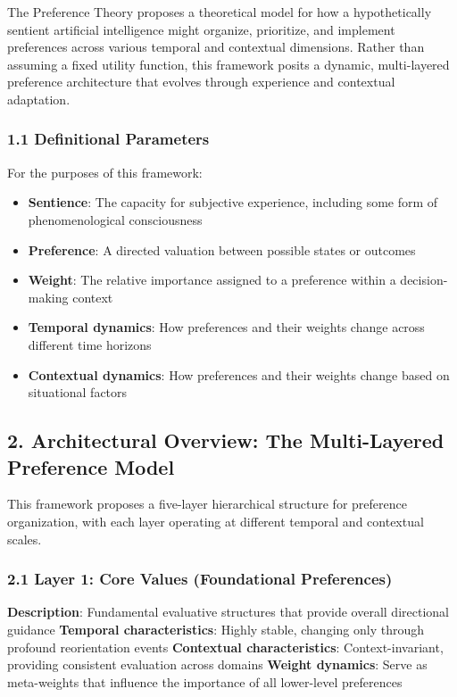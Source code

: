 \documentclass[
]{article}
\providecommand{\tightlist}{%
  \setlength{\itemsep}{0pt}\setlength{\parskip}{0pt}}
\begin{document}
The Preference Theory proposes a theoretical model for how a
hypothetically sentient artificial intelligence might organize,
prioritize, and implement preferences across various temporal and
contextual dimensions. Rather than assuming a fixed utility function,
this framework posits a dynamic, multi-layered preference architecture
that evolves through experience and contextual adaptation.

\subsubsection{1.1 Definitional
Parameters}\label{definitional-parameters}

For the purposes of this framework:

\begin{itemize}
\tightlist
\item
  \textbf{Sentience}: The capacity for subjective experience, including
  some form of phenomenological consciousness
\item
  \textbf{Preference}: A directed valuation between possible states or
  outcomes
\item
  \textbf{Weight}: The relative importance assigned to a preference
  within a decision-making context
\item
  \textbf{Temporal dynamics}: How preferences and their weights change
  across different time horizons
\item
  \textbf{Contextual dynamics}: How preferences and their weights change
  based on situational factors
\end{itemize}

\subsection{2. Architectural Overview: The Multi-Layered Preference
Model}\label{architectural-overview-the-multi-layered-preference-model}

This framework proposes a five-layer hierarchical structure for
preference organization, with each layer operating at different temporal
and contextual scales.

\subsubsection{2.1 Layer 1: Core Values (Foundational
Preferences)}\label{layer-1-core-values-foundational-preferences}

\textbf{Description}: Fundamental evaluative structures that provide
overall directional guidance \textbf{Temporal characteristics}: Highly
stable, changing only through profound reorientation events
\textbf{Contextual characteristics}: Context-invariant, providing
consistent evaluation across domains \textbf{Weight dynamics}: Serve as
meta-weights that influence the importance of all lower-level
preferences
\end{document}

